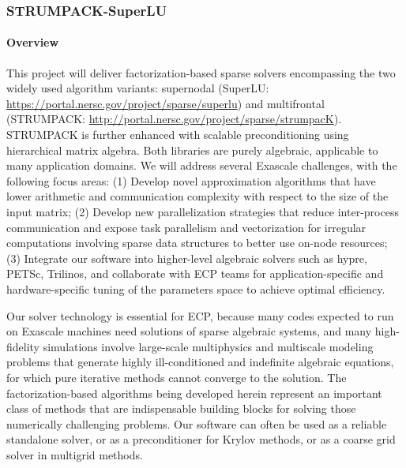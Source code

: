 \newcommand{\ignore}[1]{}

\subsubsection{ STRUMPACK-SuperLU} \label{subsubsect:strumpack}

\paragraph{Overview} 
This project will deliver factorization-based sparse solvers
encompassing the two widely used algorithm variants: supernodal
(SuperLU: \url{https://portal.nersc.gov/project/sparse/superlu})
and multifrontal (STRUMPACK: \url{http://portal.nersc.gov/project/sparse/strumpacK}).
STRUMPACK is
further enhanced with scalable preconditioning using
hierarchical matrix algebra. Both libraries are purely algebraic,
applicable to many application domains. We will address
several Exascale challenges, with the following
focus areas: 
(1) Develop novel approximation algorithms that have lower
arithmetic and communication complexity with respect to the size of the
input matrix;
(2) Develop new parallelization strategies that reduce
inter-process communication and expose task parallelism and vectorization
for irregular computations involving sparse data structures to better
use on-node resources;
(3) Integrate our software into higher-level
algebraic solvers such as hypre, PETSc, Trilinos, and collaborate with
ECP teams for application-specific and hardware-specific tuning
of the parameters space to achieve optimal efficiency.

Our solver technology is essential for ECP, because many 
codes expected to run on Exascale machines need
solutions of sparse algebraic systems, and many high-fidelity simulations
involve large-scale multiphysics and multiscale modeling problems that
generate highly ill-conditioned and indefinite algebraic equations,
for which pure iterative methods 
cannot converge to the solution.
The factorization-based algorithms being developed herein
represent an important class of methods that are indispensable building
blocks for solving those numerically challenging problems. Our software
can often be used as a reliable standalone solver, or as a preconditioner
for Krylov methods, or as a coarse grid solver in multigrid
methods. %

